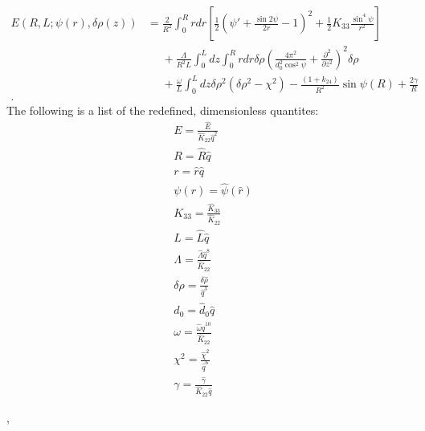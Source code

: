 \documentclass[12pt]{article}
\begin{document}
\begin{align}
E(R,L;\psi(r),\delta\rho(z))&=\frac{2}{R^2}\int_0^{R}rdr\left[\frac{1}{2}\left(\psi'+\frac{\sin2\psi}{2r}-1\right)^2+\frac{1}{2}K_{33}\frac{\sin^4\psi}{r^2}\right]\nonumber\\
&\phantom{=}+\frac{\Lambda}{R^2L}\int_0^{L}dz\int_0^{R}rdr\delta\rho\left(\frac{4\pi^2}{d_0^2\cos^2\psi}+\frac{\partial^2}{\partial z^2}\right)^2\delta\rho\nonumber\\
&\phantom{=}+\frac{\omega}{L}\int_0^{L}dz\delta\rho^2\left(\delta\rho^2-\chi^2\right)-\frac{(1+k_{24})}{R^2}\sin\psi(R)+\frac{2\gamma}{R}\nonumber\\.
\end{align}
The following is a list of the redefined, dimensionless quantites:
\begin{align}
&E=\frac{\hat{E}}{\hat{K}_{22}\hat{q}^2}\\
&R=\hat{R}\hat{q}\\
&r=\hat{r}\hat{q}\\
&\psi(r)=\hat{\psi}(\hat{r})\\
&K_{33}=\frac{\hat{K}_{33}}{\hat{K}_{22}}\\
&L=\hat{L}\hat{q}\\
&\Lambda=\frac{\hat{\Lambda}\hat{q}^8}{\hat{K}_{22}}\\
&\delta\rho=\frac{\delta\hat{\rho}}{\hat{q}^3}\\
&d_0=\hat{d}_0\hat{q}\\
&\omega=\frac{\hat{\omega}\hat{q}^{10}}{\hat{K}_{22}}\\
&\chi^2=\frac{\hat{\chi}^2}{\hat{q}^6}\\
&\gamma=\frac{\hat{\gamma}}{\hat{K}_{22}\hat{q}}
\end{align}



 \cite{Elder:2004ct} \cite{Odijk:liqcryst1986},

\clearpage


\end{document}
